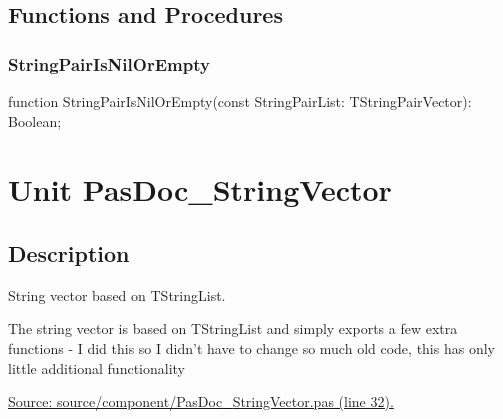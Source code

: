 \documentclass{report}
\newif\ifpdf
\begin{document}
\section{Functions and Procedures}
\ifpdf
\subsection*{\large{\textbf{StringPairIsNilOrEmpty}}\normalsize\hspace{1ex}\hrulefill}
\else
\subsection*{StringPairIsNilOrEmpty}
\fi
\label{PasDoc_StringPairVector-StringPairIsNilOrEmpty}
\begin{list}{}{
\setlength{\itemindent}{0cm}
\setlength{\listparindent}{0cm}
\setlength{\leftmargin}{\evensidemargin}
\addtolength{\leftmargin}{\tmplength}
\settowidth{\labelsep}{X}
\addtolength{\leftmargin}{\labelsep}
\setlength{\labelwidth}{\tmplength}
}
\item[\textbf{Declaration}\hfill]
\ifpdf
\begin{flushleft}
\fi
\begin{ttfamily}
function StringPairIsNilOrEmpty(const StringPairList: TStringPairVector): Boolean;\end{ttfamily}

\ifpdf
\end{flushleft}
\fi

\end{list}
\chapter{Unit PasDoc{\_}StringVector}
\label{PasDoc_StringVector}
\section{Description}
String vector based on TStringList.\hfill\vspace*{1ex}

   The string vector is based on TStringList and simply exports a few extra functions {-} I did this so I didn't have to change so much old code, this has only little additional functionality\par
\href{https://github.com/pasdoc/pasdoc/blob/master/source/component/PasDoc_StringVector.pas#L32}{Source: source/component/PasDoc{\_}StringVector.pas (line 32).}
\end{document}
